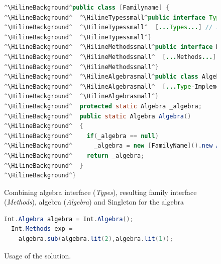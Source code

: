 \documentclass{report}
\newcommand{\HilineBackground}{}
\newcommand{\HilineTypessmall}{}
\newcommand{\HilineMethodssmall}{}
\newcommand{\HilineAlgebrasmall}{}
\begin{document}
\begin{figure}[H]
\begin{lstlisting}[language=java]
^\HilineBackground^public class [Familyname] {
^\HilineBackground^  ^\HilineTypessmall^public interface Types<A> {
^\HilineBackground^  ^\HilineTypessmall^  [...Types...] // see figure ^\color{gray}\ref{algebraInterfaces}^
^\HilineBackground^  ^\HilineTypessmall^} 
^\HilineBackground^  ^\HilineMethodssmall^public interface Methods {
^\HilineBackground^  ^\HilineMethodssmall^  [...Methods...] // see figure ^\color{gray}\ref{dynamicDispatchMethods}^
^\HilineBackground^  ^\HilineMethodssmall^} 
^\HilineBackground^  ^\HilineAlgebrasmall^public class Algebra implements Types<Methods> { 
^\HilineBackground^  ^\HilineAlgebrasmall^  [...Type-Implementation...] // see figure ^\color{gray}\ref{dynamicDispatchAlgebra}^
^\HilineBackground^  ^\HilineAlgebrasmall^}
^\HilineBackground^  protected static Algebra _algebra;
^\HilineBackground^  public static Algebra Algebra()
^\HilineBackground^  { 
^\HilineBackground^    if(_algebra == null)
^\HilineBackground^      _algebra = new [FamilyName]().new Algebra();
^\HilineBackground^    return _algebra;
^\HilineBackground^  }
^\HilineBackground^}
\end{lstlisting}
\caption{Combining algebra interface (\emph{Types}), resulting family interface (\emph{Methods}), algebra (\emph{Algebra}) and Singleton for the algebra}
\label{combinedClass}
\end{figure}

\begin{figure}[H]
\begin{lstlisting}[language=java]
  Int.Algebra algebra = Int.Algebra();
  Int.Methods exp = 
    algebra.sub(algebra.lit(2),algebra.lit(1));
\end{lstlisting}
\caption{Usage of the solution.}
\label{combinedClassUsage}
\end{figure}
\end{document}
